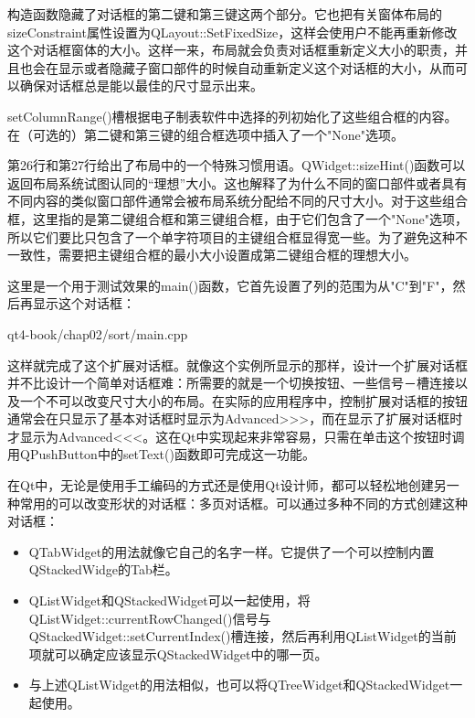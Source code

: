 \documentclass[11pt,oneside]{book}
\begin{document}
\begin{common-format}
构造函数隐藏了对话框的第二键和第三键这两个部分。它也把有关窗体布局的sizeConstraint属性设置为QLayout::SetFixedSize，这样会使用户不能再重新修改这个对话框窗体的大小。这样一来，布局就会负责对话框重新定义大小的职责，并且也会在显示或者隐藏子窗口部件的时候自动重新定义这个对话框的大小，从而可以确保对话框总是能以最佳的尺寸显示出来。

setColumnRange()槽根据电子制表软件中选择的列初始化了这些组合框的内容。在（可选的）第二键和第三键的组合框选项中插入了一个"None"选项。

第26行和第27行给出了布局中的一个特殊习惯用语。QWidget::sizeHint()函数可以返回布局系统试图认同的“理想”大小。这也解释了为什么不同的窗口部件或者具有不同内容的类似窗口部件通常会被布局系统分配给不同的尺寸大小。对于这些组合框，这里指的是第二键组合框和第三键组合框，由于它们包含了一个"None"选项，所以它们要比只包含了一个单字符项目的主键组合框显得宽一些。为了避免这种不一致性，需要把主键组合框的最小大小设置成第二键组合框的理想大小。

这里是一个用于测试效果的main()函数，它首先设置了列的范围为从"C"到"F"，然后再显示这个对话框：
\begin{cppinput}{qt4-book/chap02/sort/main.cpp}
\end{cppinput}

这样就完成了这个扩展对话框。就像这个实例所显示的那样，设计一个扩展对话框并不比设计一个简单对话框难：所需要的就是一个切换按钮、一些信号－槽连接以及一个不可以改变尺寸大小的布局。在实际的应用程序中，控制扩展对话框的按钮通常会在只显示了基本对话框时显示为Advanced>>>，而在显示了扩展对话框时才显示为Advanced<<<。这在Qt中实现起来非常容易，只需在单击这个按钮时调用QPushButton中的setText()函数即可完成这一功能。

在Qt中，无论是使用手工编码的方式还是使用Qt设计师，都可以轻松地创建另一种常用的可以改变形状的对话框：多页对话框。可以通过多种不同的方式创建这种对话框：
\begin{itemize}
\item QTabWidget的用法就像它自己的名字一样。它提供了一个可以控制内置QStackedWidge的Tab栏。
\item QListWidget和QStackedWidget可以一起使用，将\\ QListWidget::currentRowChanged()信号与\\ QStackedWidget::setCurrentIndex()槽连接，然后再利用QListWidget的当前项就可以确定应该显示QStackedWidget中的哪一页。
\item 与上述QListWidget的用法相似，也可以将QTreeWidget和QStackedWidget一起使用。
\end{itemize}


\end{common-format}
\end{document}
